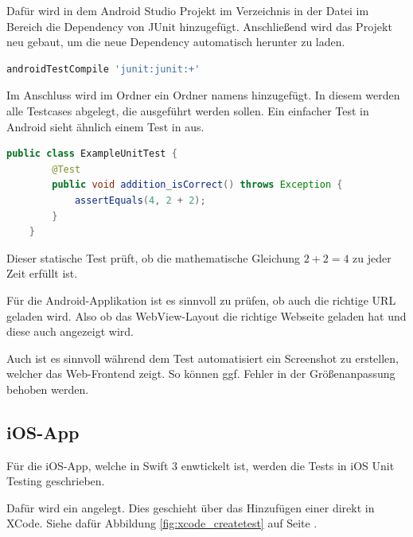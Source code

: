Dafür wird in dem Android Studio Projekt im Verzeichnis  in der Datei  im Bereich
 die Dependency von JUnit hinzugefügt. Anschließend wird das Projekt neu gebaut, um die neue Dependency
automatisch herunter zu laden.

\begin{lstlisting}[language=bash, caption=Dependency hinzufügen, label=Dependency hinzufügen]
    androidTestCompile 'junit:junit:+'
\end{lstlisting}

Im Anschluss wird im Ordner  ein Ordner namens  hinzugefügt. In diesem werden alle Testcases
abgelegt, die ausgeführt werden sollen. Ein einfacher Test in Android sieht ähnlich einem Test in  aus.

\begin{lstlisting}[language=java, caption=Einfacher Test für Android, label=Einfacher Test für Android]
    public class ExampleUnitTest {
        @Test
        public void addition_isCorrect() throws Exception {
            assertEquals(4, 2 + 2);
        }
    }
\end{lstlisting}

Dieser statische Test prüft, ob die mathematische Gleichung \begin{math} 2+2 = 4 \end{math} zu jeder Zeit erfüllt ist.

Für die Android-Applikation ist es sinnvoll zu prüfen, ob auch die richtige URL geladen wird. Also ob das WebView-Layout
die richtige Webseite geladen hat und diese auch angezeigt wird.

Auch ist es sinnvoll während dem Test automatisiert ein Screenshot zu erstellen, welcher das Web-Frontend zeigt. So können
ggf. Fehler in der Größenanpassung behoben werden.

\subsection{iOS-App}
Für die iOS-App, welche in Swift 3 enwtickelt ist, werden die Tests in iOS Unit Testing geschrieben.

Dafür wird ein  angelegt. Dies geschieht über das Hinzufügen einer  direkt in
XCode. Siehe dafür Abbildung \ref{fig:xcode_createtest} auf Seite \pageref{fig:xcode_createtest}.


